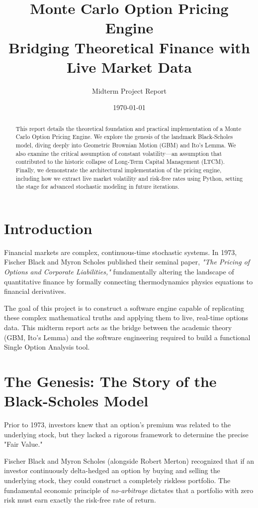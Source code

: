 \documentclass[12pt, a4paper]{article}
\title{\textbf{Monte Carlo Option Pricing Engine}\\
\Large Bridging Theoretical Finance with Live Market Data}
\author{Midterm Project Report}
\date{\today}
\begin{document}
\maketitle

\begin{abstract}
This report details the theoretical foundation and practical implementation of a Monte Carlo Option Pricing Engine. We explore the genesis of the landmark Black-Scholes model, diving deeply into Geometric Brownian Motion (GBM) and Ito's Lemma. We also examine the critical assumption of constant volatility---an assumption that contributed to the historic collapse of Long-Term Capital Management (LTCM). Finally, we demonstrate the architectural implementation of the pricing engine, including how we extract live market volatility and risk-free rates using Python, setting the stage for advanced stochastic modeling in future iterations.
\end{abstract}

\tableofcontents
\newpage

\section{Introduction}
Financial markets are complex, continuous-time stochastic systems. In 1973, Fischer Black and Myron Scholes published their seminal paper, \textit{"The Pricing of Options and Corporate Liabilities,"} fundamentally altering the landscape of quantitative finance by formally connecting thermodynamics physics equations to financial derivatives.

The goal of this project is to construct a software engine capable of replicating these complex mathematical truths and applying them to live, real-time options data. This midterm report acts as the bridge between the academic theory (GBM, Ito's Lemma) and the software engineering required to build a functional Single Option Analysis tool.

\section{The Genesis: The Story of the Black-Scholes Model}
Prior to 1973, investors knew that an option's premium was related to the underlying stock, but they lacked a rigorous framework to determine the precise "Fair Value."

Fischer Black and Myron Scholes (alongside Robert Merton) recognized that if an investor continuously delta-hedged an option by buying and selling the underlying stock, they could construct a completely riskless portfolio. The fundamental economic principle of \textit{no-arbitrage} dictates that a portfolio with zero risk must earn exactly the risk-free rate of return.
\end{document}
